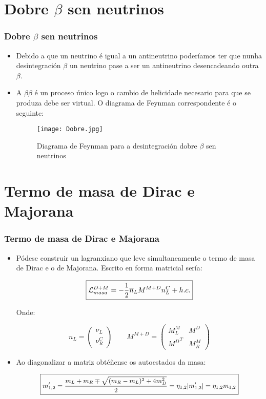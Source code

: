 \documentclass[10pt]{beamer}
\newcommand{\beq}{\begin{equation}}
\newcommand{\eeq}{\end{equation}}
\newcommand{\bi}{\begin{itemize}}
\newcommand{\ei}{\end{itemize}}
\newcommand{\bbx}{\begin{boxed}}
\newcommand{\ebx}{\end{boxed}}
\newcommand{\bmx}{\left(\begin{array}}
\newcommand{\emx}{\end{array}\right)}
\newcommand{\barra}[1]{\overline{#1}}
\newcommand{\abs}[1]{\vert #1 \vert}
\newcommand{\chula}[1]{\mathcal{#1}}
\begin{document}
\section{Dobre $\beta$ sen neutrinos}

\begin{frame} \frametitle{Dobre $\beta$ sen neutrinos}
\bi

\item Debido a que un neutrino é igual a un antineutrino poderíamos ter que nunha desintegración $\beta$ un neutrino pase a ser un antineutrino desencadeando outra $\beta$.

\item A $\beta\beta$ é un proceso único logo o cambio de helicidade necesario para que se produza debe ser virtual. O diagrama de Feynman correspondente é o seguinte:

\begin{figure}[h!]
	\centering
		\texttt{[image: Dobre.jpg]}
	\caption{Diagrama de Feynman para a desintegración dobre $\beta$ sen neutrinos}
\end{figure}

\ei
\end{frame}

\section{Termo de masa de Dirac e Majorana}

\begin{frame} \frametitle{Termo de masa de Dirac e Majorana}
\bi

\item Pódese construir un lagranxiano que leve simultaneamente o termo de masa de Dirac e o de Majorana. Escrito en forma matricial sería:

\beq
\bbx{
\chula L_{masa}^{D+M} = - \frac{1}{2} \barra n_L M^{M+D} n_L^C + h.c.
}\ebx \nonumber
\eeq

Onde:

\beq
n_L = \bmx{c} \nu_L \\ \nu_R^C \emx \qquad M^{M+D} = \bmx{cc} M_L^M & M^D \\ {M^D}^T & M_R^M \emx \nonumber
\eeq

\item Ao diagonalizar a matriz obtéñense os autoestados da masa:

\beq
\small
\bbx{ m_{1,2}' = \frac{m_L + m_R \mp \sqrt{(m_R - m_L)^2 + 4m_D^2}}{2} = \eta_{1,2} \abs{m_{1,2}'} = \eta_{1,2} m_{1,2} }\ebx \nonumber
\eeq

\ei
\end{frame}
\end{document}
